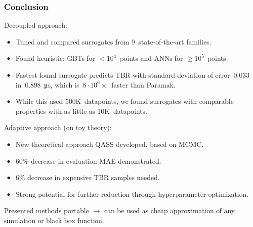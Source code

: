 \begin{frame}
	\frametitle{Conclusion}

	Decoupled approach:

	\begin{itemize}
		\item
			Tuned and compared surrogates from 9~state-of-the-art families.
		\item
			Found heuristic: GBTs for $<10^4$~points and
			ANNs for $\geq10^5$~points.
		\item
			Fastest found surrogate predicts TBR with standard deviation of
			error~$\num{0.033}$ in~\SI{0.898}{\micro\second}, which is~$8\cdot
			10^6\times$~faster than Paramak.
		\item
			While this used 500K~datapoints, we found surrogates with
			comparable properties with as little as 10K~datapoints.
	\end{itemize}

	\vspace{0.5em}

	Adaptive approach (on toy theory):
	\begin{itemize}
	    \item
	        New theoretical approach QASS developed, based on MCMC.
		\item 
			$60\%$ decrease in evaluation MAE demonstrated.
		\item
			$6\%$ decrease in expensive TBR samples needed.
		\item
			Strong potential for further reduction through hyperparameter optimization.
	\end{itemize}

	\vspace{0.5em}

	Presented methods portable $\rightarrow$ can be used as cheap
	approximation of any simulation or black box function.
\end{frame}

